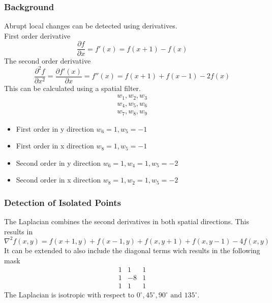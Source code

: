 \subsubsection{Background}

Abrupt local changes can be detected using derivatives.\\
First order derivative
\[
	\frac{\partial f}{\partial x} = f'(x)=f(x+1)-f(x)
\]
The second order derivative
\[
	\frac{\partial^2f}{\partial x^2}=\frac{\partial f'(x)}{\partial x}=f''(x)=f(x+1)+f(x-1)-2f(x)
\]
This can be calculated using a spatial filter.
\[
	\begin{matrix}
	w_1, w_2, w_3\\
	w_4, w_5, w_6\\
	w_7, w_8, w_9
	\end{matrix}
\]
\begin{itemize}
\item First order in y direction $w_6=1, w_5=-1$
\item First order in x direction $w_8=1, w_5=-1$
\item Second order in y direction $w_6=1, w_4=1, w_5=-2$
\item Second order in x direction $w_8=1, w_2=1, w_5=-2$
\end{itemize}
\subsubsection{Detection of Isolated Points}
The Laplacian combines the second derivatives in both spatial directions. This results in
\[
	\nabla^2f(x,y)=f(x+1,y)+f(x-1,y)+f(x,y+1)+f(x,y-1)-4f(x,y)
\]
It can be extended to also include the diagonal terms wich results in the following mask
\[
	\begin{matrix}
	 1 & 1 & 1\\
	 1 & -8 & 1\\
	 1 & 1 & 1
	\end{matrix}
\]
The Laplacian is isotropic with respect to $0^\circ, 45^\circ, 90^\circ \text{ and } 135^\circ$. 

